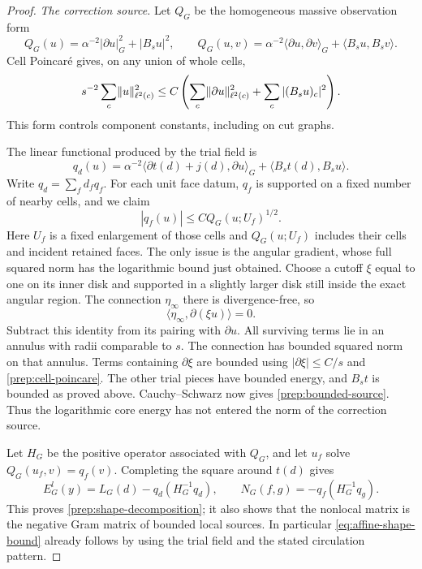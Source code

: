 \begin{proof}
\emph{The correction source.}
Let $Q_G$ be the homogeneous massive observation form
\begin{equation}\label{prep:massive-form}
 Q_G(u)=\alpha^{-2}|\partial u|_G^2+|B_su|^2,
 \qquad Q_G(u,v)=\alpha^{-2}\langle\partial u,\partial v\rangle_G
                                      +\langle B_su,B_sv\rangle.
\end{equation}
Cell Poincar\'e gives, on any union of whole cells,
\begin{equation}\label{prep:cell-poincare}
 s^{-2}\sum_c\lVert u\rVert_{\ell^2(c)}^2
       \le C\left(\sum_c\lVert\partial u\rVert_{\ell^2(c)}^2
                                          +\sum_c|(B_su)_c|^2\right).
\end{equation}
This form controls component constants, including on cut graphs.

The linear functional produced by the trial field is
\[
 q_d(u)=\alpha^{-2}\langle\partial t(d)+j(d),\partial u\rangle_G
                                        +\langle B_st(d),B_su\rangle.
\]
Write $q_d=\sum_fd_fq_f$.  For each unit face datum, $q_f$ is supported
on a fixed number of nearby cells, and we claim
\begin{equation}\label{prep:bounded-source}
                         |q_f(u)|\le C Q_G(u;U_f)^{1/2}.
\end{equation}
Here $U_f$ is a fixed enlargement of those cells and $Q_G(u;U_f)$
includes their cells and incident retained faces.  The only issue is the
angular gradient, whose full squared norm has the logarithmic bound
just obtained.  Choose a cutoff $\xi$ equal to one on its inner disk and
supported in a slightly larger disk still inside the exact angular
region.  The connection $\eta_\infty$ there is divergence-free, so
\[
                     \langle\eta_\infty,\partial(\xi u)\rangle=0.
\]
Subtract this identity from its pairing with $\partial u$.  All surviving
terms lie in an annulus with radii comparable to $s$.  The connection has
bounded squared norm on that annulus.  Terms containing $\partial\xi$
are bounded using $|\partial\xi|\le C/s$ and
\eqref{prep:cell-poincare}.  The other trial pieces have bounded energy,
and $B_st$ is bounded as proved above.  Cauchy--Schwarz now gives
\eqref{prep:bounded-source}.  Thus the logarithmic core energy has not
entered the norm of the correction source.

Let $H_G$ be the positive operator associated with $Q_G$, and let $u_f$
solve $Q_G(u_f,v)=q_f(v)$.  Completing the square around $t(d)$ gives
\[
 E_G^l(y)=L_G(d)-q_d(H_G^{-1}q_d),
 \qquad N_G(f,g)=-q_f(H_G^{-1}q_g).
\]
This proves \eqref{prep:shape-decomposition}; it also shows that the
nonlocal matrix is the negative Gram matrix of bounded local sources.
In particular \eqref{eq:affine-shape-bound} already follows by using the
trial field and the stated circulation pattern.


\end{proof}
